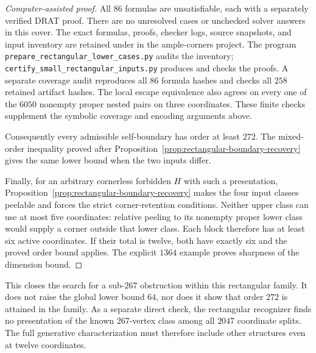\documentclass[11pt]{article}
\numberwithin{equation}{section}
\theoremstyle{definition}
\theoremstyle{remark}
\begin{document}
\begin{proof}[Computer-assisted proof]
All $86$ formulas are unsatisfiable, each with a separately verified
DRAT proof. There are no unresolved cases or unchecked solver answers
in this cover. The exact formulas, proofs, checker logs, source snapshots,
and input inventory are retained under
 in the ample-corners project.
The program \texttt{prepare\_rectangular\_lower\_cases.py} audits the
inventory; \texttt{certify\_small\_rectangular\_inputs.py} produces and
checks the proofs. A separate coverage audit reproduces all $86$ formula
hashes and checks all $258$ retained artifact hashes. The local escape
equivalence also agrees on every one of the $6050$ nonempty proper
nested pairs on three coordinates. These finite checks supplement the
symbolic coverage and encoding arguments above.

Consequently every admissible self-boundary has order at least $272$.
The mixed-order inequality proved after
Proposition~\ref{prop:rectangular-boundary-recovery} gives the same
lower bound when the two inputs differ.

Finally, for an arbitrary cornerless forbidden $H$ with such a
presentation, Proposition~\ref{prop:rectangular-boundary-recovery}
makes the four input classes peelable and forces the strict
corner-retention conditions. Neither upper class can use at most
five coordinates: relative peeling to its nonempty proper lower
class would supply a corner outside that lower class. Each block
therefore has at least six active coordinates. If their total is
twelve, both have exactly six and the proved order bound applies.
The explicit $1364$ example proves sharpness of the dimension bound.
\end{proof}

This closes the search for a sub-$267$ obstruction within this
rectangular family. It does not raise the global lower bound $64$,
nor does it show that order $272$ is attained in the family. As a
separate direct check, the rectangular recognizer finds no presentation
of the known $267$-vertex class among all $2047$ coordinate splits.
The full generative characterization must therefore include other
structures even at twelve coordinates.
\end{document}
